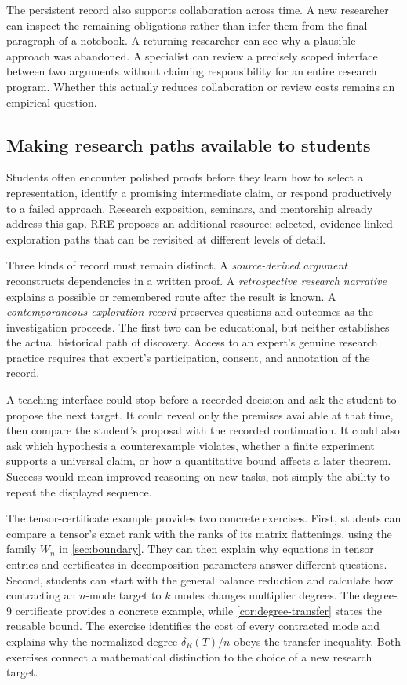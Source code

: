The persistent record also supports collaboration across time. A new researcher can inspect the remaining obligations rather than infer them from the final paragraph of a notebook. A returning researcher can see why a plausible approach was abandoned. A specialist can review a precisely scoped interface between two arguments without claiming responsibility for an entire research program. Whether this actually reduces collaboration or review costs remains an empirical question.

\subsection{Making research paths available to students}

Students often encounter polished proofs before they learn how to select a representation, identify a promising intermediate claim, or respond productively to a failed approach. Research exposition, seminars, and mentorship already address this gap. RRE proposes an additional resource: selected, evidence-linked exploration paths that can be revisited at different levels of detail.

Three kinds of record must remain distinct. A \emph{source-derived argument} reconstructs dependencies in a written proof. A \emph{retrospective research narrative} explains a possible or remembered route after the result is known. A \emph{contemporaneous exploration record} preserves questions and outcomes as the investigation proceeds. The first two can be educational, but neither establishes the actual historical path of discovery. Access to an expert's genuine research practice requires that expert's participation, consent, and annotation of the record.

A teaching interface could stop before a recorded decision and ask the student to propose the next target. It could reveal only the premises available at that time, then compare the student's proposal with the recorded continuation. It could also ask which hypothesis a counterexample violates, whether a finite experiment supports a universal claim, or how a quantitative bound affects a later theorem. Success would mean improved reasoning on new tasks, not simply the ability to repeat the displayed sequence.

The tensor-certificate example provides two concrete exercises. First, students can compare a tensor's exact rank with the ranks of its matrix flattenings, using the family $W_n$ in \cref{sec:boundary}. They can then explain why equations in tensor entries and certificates in decomposition parameters answer different questions. Second, students can start with the general balance reduction and calculate how contracting an $n$-mode target to $k$ modes changes multiplier degrees. The degree-9 certificate provides a concrete example, while \cref{cor:degree-transfer} states the reusable bound. The exercise identifies the cost of every contracted mode and explains why the normalized degree $\delta_R(T)/n$ obeys the transfer inequality. Both exercises connect a mathematical distinction to the choice of a new research target.

